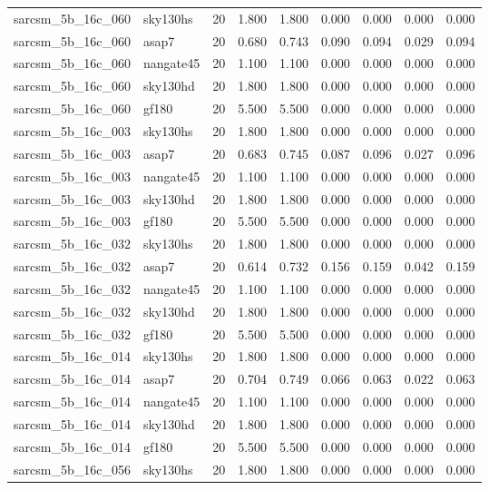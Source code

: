 \begin{tabular}{llrrrrrrr}
sarcsm\_5b\_16c\_060 & sky130hs & 20 & 1.800 & 1.800 & 0.000 & 0.000 & 0.000 & 0.000 \\
sarcsm\_5b\_16c\_060 & asap7 & 20 & 0.680 & 0.743 & 0.090 & 0.094 & 0.029 & 0.094 \\
sarcsm\_5b\_16c\_060 & nangate45 & 20 & 1.100 & 1.100 & 0.000 & 0.000 & 0.000 & 0.000 \\
sarcsm\_5b\_16c\_060 & sky130hd & 20 & 1.800 & 1.800 & 0.000 & 0.000 & 0.000 & 0.000 \\
sarcsm\_5b\_16c\_060 & gf180 & 20 & 5.500 & 5.500 & 0.000 & 0.000 & 0.000 & 0.000 \\
sarcsm\_5b\_16c\_003 & sky130hs & 20 & 1.800 & 1.800 & 0.000 & 0.000 & 0.000 & 0.000 \\
sarcsm\_5b\_16c\_003 & asap7 & 20 & 0.683 & 0.745 & 0.087 & 0.096 & 0.027 & 0.096 \\
sarcsm\_5b\_16c\_003 & nangate45 & 20 & 1.100 & 1.100 & 0.000 & 0.000 & 0.000 & 0.000 \\
sarcsm\_5b\_16c\_003 & sky130hd & 20 & 1.800 & 1.800 & 0.000 & 0.000 & 0.000 & 0.000 \\
sarcsm\_5b\_16c\_003 & gf180 & 20 & 5.500 & 5.500 & 0.000 & 0.000 & 0.000 & 0.000 \\
sarcsm\_5b\_16c\_032 & sky130hs & 20 & 1.800 & 1.800 & 0.000 & 0.000 & 0.000 & 0.000 \\
sarcsm\_5b\_16c\_032 & asap7 & 20 & 0.614 & 0.732 & 0.156 & 0.159 & 0.042 & 0.159 \\
sarcsm\_5b\_16c\_032 & nangate45 & 20 & 1.100 & 1.100 & 0.000 & 0.000 & 0.000 & 0.000 \\
sarcsm\_5b\_16c\_032 & sky130hd & 20 & 1.800 & 1.800 & 0.000 & 0.000 & 0.000 & 0.000 \\
sarcsm\_5b\_16c\_032 & gf180 & 20 & 5.500 & 5.500 & 0.000 & 0.000 & 0.000 & 0.000 \\
sarcsm\_5b\_16c\_014 & sky130hs & 20 & 1.800 & 1.800 & 0.000 & 0.000 & 0.000 & 0.000 \\
sarcsm\_5b\_16c\_014 & asap7 & 20 & 0.704 & 0.749 & 0.066 & 0.063 & 0.022 & 0.063 \\
sarcsm\_5b\_16c\_014 & nangate45 & 20 & 1.100 & 1.100 & 0.000 & 0.000 & 0.000 & 0.000 \\
sarcsm\_5b\_16c\_014 & sky130hd & 20 & 1.800 & 1.800 & 0.000 & 0.000 & 0.000 & 0.000 \\
sarcsm\_5b\_16c\_014 & gf180 & 20 & 5.500 & 5.500 & 0.000 & 0.000 & 0.000 & 0.000 \\
sarcsm\_5b\_16c\_056 & sky130hs & 20 & 1.800 & 1.800 & 0.000 & 0.000 & 0.000 & 0.000 \\

\end{tabular}
